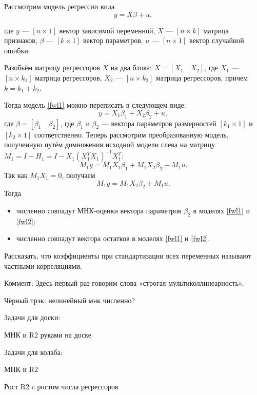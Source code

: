 \documentclass[12pt]{article}
\begin{document}
\begin{theorem}

Рассмотрим модель регрессии вида
\begin{equation} \label{fwl1}
  y = X\beta + u,  
\end{equation}

где $y$ — $[n \times 1]$  вектор зависимой переменной, $X$ — $[n \times k]$ матрица признаков, $\beta$ — $[k \times 1]$ вектор параметров, $u$ — $[n \times 1]$ вектор случайной ошибки.

Разобьём матрицу регрессоров $X$ на два блока: $X = [X_1 \quad X_2]$, где $X_1$ — $[n \times k_1]$ матрица регрессоров, $X_2$ — $[n \times k_2]$ матрица регрессоров, причем $k = k_1 + k_2$.

Тогда модель \ref{fwl1} можно переписать в следующем виде:
\[
y = X_1 \beta_1 + X_2 \beta_2 + u,
\]
где $\beta = [\beta_1 \quad \beta_2]$, где $\beta_1$ и $\beta_2$ — вектора параметров размерностей $[k_1 \times 1]$ и $[k_2 \times 1]$ соответственно.
Теперь рассмотрим преобразованную модель, полученную путём домножения исходной модели слева на матрицу $M_1 = I - H_1 = I - X_1(X_1^TX_1)^{-1}X_1^T$:
\[
M_1 y = M_1 X_1 \beta_1 + M_1 X_2 \beta_2 + M_1u.
\]
Так как $M_1 X_1 = 0$, получаем
\begin{equation} \label{fwl2}
M_1 y = M_1 X_2 \beta_2 + M_1u.
\end{equation}
Тогда
\begin{itemize}
    \item численно совпадут МНК-оценки вектора параметров $\beta_2$ в моделях \ref{fwl1} и \ref{fwl2};
    \item численно совпадут вектора остатков в моделях \ref{fwl1} и \ref{fwl2}.
\end{itemize}

\end{theorem}

 
Рассказать, что коэффициенты при стандартизации всех переменных называют частными корреляциями. 

Коммент: Здесь первый раз говорим слова «строгая мультиколлинеарность».

Чёрный трэк: нелинейный мнк численно?

Задачи для доски:

МНК и R2 руками на доске

Задачи для колаба:

МНК и R2

Рост R2 c ростом числа регрессоров
\end{document}
